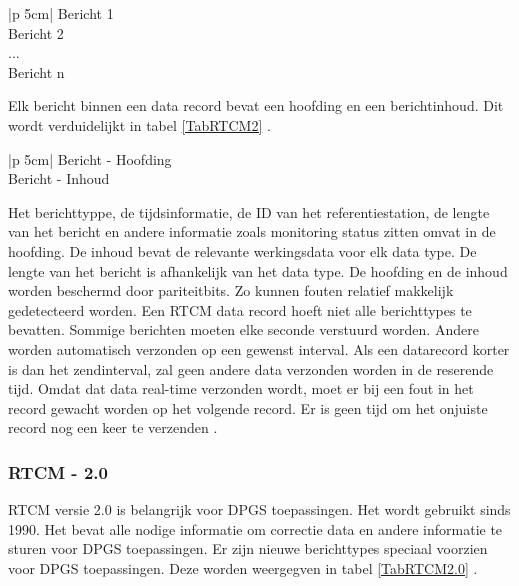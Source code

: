 \begin{table}[hbp]
	\caption{RTCM record, verdeeld in verschillende berichttypes}		
	\begin{tabular}{|p {5cm}|}	
		\hline
		Bericht 1 \\ \hline
		Bericht 2 \\ \hline
		... \\ \hline
		Bericht n \\ \hline
	\end{tabular}
	\label{TabRTCMBer}
\end{table}

Elk bericht binnen een data record bevat een hoofding en een berichtinhoud. Dit wordt verduidelijkt in tabel \ref{TabRTCM2} \cite{LBibRTCM3}.

\begin{table}[hbp]
	\caption{RTCM bericht, verdeeld in hoofding en bericht}		
	\begin{tabular}{|p {5cm}|}	
		\hline
		Bericht - Hoofding \\ \hline
		Bericht - Inhoud \\ \hline
	\end{tabular}
	\label{TabRTCM2}
\end{table}

Het berichttyppe, de tijdsinformatie, de ID van het referentiestation, de lengte van het bericht en andere informatie zoals monitoring status zitten omvat in de hoofding. De inhoud bevat de relevante werkingsdata voor elk data type. De lengte van het bericht is afhankelijk van het data type. De hoofding en de inhoud worden beschermd door pariteitbits. Zo kunnen fouten relatief makkelijk gedetecteerd worden. Een RTCM data record hoeft niet alle berichttypes te bevatten. Sommige berichten moeten elke seconde verstuurd worden. Andere worden automatisch verzonden op een gewenst interval. Als een datarecord korter is dan het zendinterval, zal geen andere data verzonden worden in de reserende tijd. Omdat dat data real-time verzonden wordt, moet er bij een fout in het record gewacht worden op het volgende record. Er is geen tijd om het onjuiste record nog een keer te verzenden \cite{LBibRTCM3}. 

\subsubsection{RTCM - 2.0}
RTCM versie 2.0 is belangrijk voor DPGS toepassingen. Het wordt gebruikt sinds 1990. Het bevat alle nodige informatie om correctie data en andere informatie te sturen voor DPGS toepassingen. Er zijn nieuwe berichttypes speciaal voorzien voor DPGS toepassingen. Deze worden weergegven in tabel \ref{TabRTCM2.0} \cite{LBibRTCM3}.

